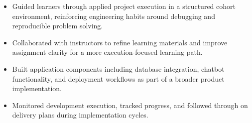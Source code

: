 
\begin{itemize}
  \item Guided learners through applied project execution in a structured cohort environment, reinforcing engineering habits around debugging and reproducible problem solving.
  \item Collaborated with instructors to refine learning materials and improve assignment clarity for a more execution-focused learning path.
\end{itemize}

\begin{itemize}
  \item Built application components including database integration, chatbot functionality, and deployment workflows as part of a broader product implementation.
  \item Monitored development execution, tracked progress, and followed through on delivery plans during implementation cycles.
\end{itemize}
